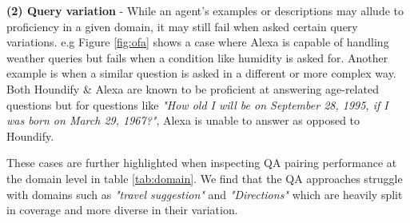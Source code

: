 \documentclass[11pt]{article}
\begin{document}
\textbf{(2) Query variation} - While an agent's examples or descriptions may allude to proficiency in a given domain, it may still fail when asked certain query variations. e.g Figure \ref{fig:ofa} shows a case where Alexa is capable of handling weather queries but fails when a condition like humidity is asked for. Another example is when a similar question is asked in a different or more complex way. Both Houndify \& Alexa are known to be proficient at answering age-related questions but for questions like \textit{"How old I will be on September 28, 1995, if I was born on March 29, 1967?"}, Alexa is unable to answer as opposed to Houndify.

These cases are further highlighted when inspecting QA pairing performance at the domain level in table \ref{tab:domain}. We find that the QA approaches struggle with domains such as \emph{"travel suggestion"} and \emph{"Directions"} which are heavily split in coverage and more diverse in their variation.

\begin{table}[]
\centering
{}
\caption{Further breakdown of the best-performing approaches per technique on a subset of 8 out of the 37 domains. We find that our MARS encoder generalizes well across the various agent domains.}
\label{tab:domain}
\vspace{-.5cm}
\end{table}
\end{document}
